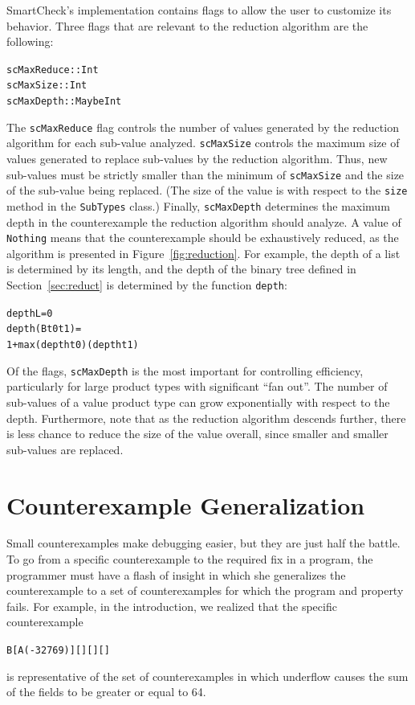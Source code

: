 \documentclass[10pt]{sigplanconf}
\newenvironment{code}{\begin{alltt}}{\end{alltt}}
\newcommand{\ttp}[1]{\texttt{#1}}
\begin{document}
SmartCheck's implementation contains flags to allow the user to customize its
behavior.  Three flags that are relevant to the reduction algorithm are the
following:
%
\begin{code}
scMaxReduce :: Int
scMaxSize   :: Int
scMaxDepth  :: Maybe Int
\end{code}
%
\noindent
The \ttp{scMaxReduce} flag controls the number of values generated by the
reduction algorithm for each sub-value analyzed.  \ttp{scMaxSize} controls the
maximum size of values generated to replace sub-values by the reduction
algorithm.  Thus, new sub-values must be strictly smaller than the minimum of
\ttp{scMaxSize} and the size of the sub-value being replaced.  (The size of the
value is with respect to the \ttp{size} method in the \ttp{SubTypes} class.)
Finally, \ttp{scMaxDepth} determines the maximum depth in the counterexample the
reduction algorithm should analyze.  A value of \ttp{Nothing} means that the
counterexample should be exhaustively reduced, as the algorithm is presented in
Figure~\ref{fig:reduction}.  For example, the depth of a list is determined by
its length, and the depth of the binary tree defined in Section~\ref{sec:reduct}
is determined by the function \ttp{depth}:
%
\begin{code}
depth L         = 0
depth (B t0 t1) =
  1 + max (depth t0) (depth t1)
\end{code}
%
\noindent
Of the flags, \ttp{scMaxDepth} is the most important for controlling
efficiency, particularly for large product types with significant ``fan out''.
The number of sub-values of a value product type can grow exponentially with
respect to the depth.  Furthermore, note that as the reduction algorithm
descends further, there is less chance to reduce the size of the value overall,
since smaller and smaller sub-values are replaced.

\section{Counterexample Generalization}\label{sec:generalization}

Small counterexamples make debugging easier, but they are just half the battle.
To go from a specific counterexample to the required fix in a program, the
programmer must have a flash of insight in which she generalizes the
counterexample to a set of counterexamples for which the program and property
fails.  For example, in the introduction, we realized that the specific
counterexample
%
\begin{code}
B [A (-32769)] [] [] []
\end{code}
%
\noindent
is representative of the set of counterexamples in which underflow causes the
sum of the fields to be greater or equal to 64.
\end{document}
